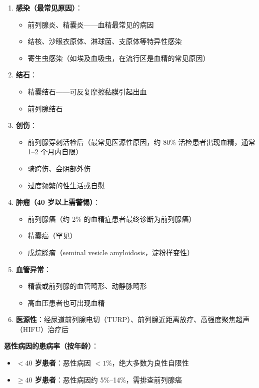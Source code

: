 \begin{enumerate}
	\item \textbf{感染（最常见原因）}：
	\begin{itemize}
		\item 前列腺炎、精囊炎——血精最常见的病因
		\item 结核、沙眼衣原体、淋球菌、支原体等特异性感染
		\item 寄生虫感染（如埃及血吸虫，在流行区是血精的常见原因）
	\end{itemize}

	\item \textbf{结石}：
	\begin{itemize}
		\item 精囊结石——可反复摩擦黏膜引起出血
		\item 前列腺结石
	\end{itemize}

	\item \textbf{创伤}：
	\begin{itemize}
		\item 前列腺穿刺活检后（最常见医源性原因，约 80\% 活检患者出现血精，通常 1--2 个月内自限）
		\item 骑跨伤、会阴部外伤
		\item 过度频繁的性生活或自慰
	\end{itemize}

	\item \textbf{肿瘤（40 岁以上需警惕）}：
	\begin{itemize}
		\item 前列腺癌（约 2\% 的血精症患者最终诊断为前列腺癌）
		\item 精囊癌（罕见）
		\item 戊烷脎瘤（seminal vesicle amyloidosis，淀粉样变性）
	\end{itemize}

	\item \textbf{血管异常}：
	\begin{itemize}
		\item 精囊或前列腺的血管畸形、动静脉畸形
		\item 高血压患者也可出现血精
	\end{itemize}

	\item \textbf{医源性}：经尿道前列腺电切（TURP）、前列腺近距离放疗、高强度聚焦超声（HIFU）治疗后
\end{enumerate}

\vspace{0.5em}
\noindent\textbf{恶性病因的患病率（按年龄）}：
\begin{itemize}[leftmargin=2cm]
	\item \textbf{$<40$ 岁患者}：恶性病因 $<1\%$，绝大多数为良性自限性
	\item \textbf{$\geq 40$ 岁患者}：恶性病因约 5\%--14\%，需排查前列腺癌
\end{itemize}

